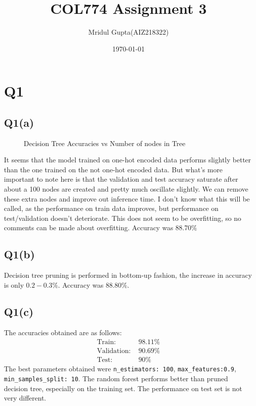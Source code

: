 \documentclass[11pt]{article}
\author{Mridul Gupta(AIZ218322)}
\date{\today}
\title{COL774 Assignment 3}
\begin{document}
\maketitle
\section{Q1}
\label{sec-1}
\subsection{Q1(a)}
\label{sec-1-1}
\begin{figure}[!ht]
	\caption{Decision Tree Accuracies vs Number of nodes in Tree}
\end{figure}
It seems that the model trained on one-hot encoded data performs
slightly better than the one trained on the not one-hot encoded
data. But what's more important to note here is that the validation
and test accuracy saturate after about a 100 nodes are created and
pretty much oscillate slightly. We can remove these extra nodes and
improve out inference time. I don't know what this will be called, as
the performance on train data improves, but performance on
test/validation doesn't deteriorate. This does not seem to be
overfitting, so no comments can be made about overfitting. Accuracy
was 88.70\(\%\)

\subsection{Q1(b)}
\label{sec-1-2}
Decision tree pruning is performed in bottom-up fashion, the increase
in accuracy is only \(0.2-0.3\%\). Accuracy was \(88.80\%\).
\subsection{Q1(c)}
\label{sec-1-3}
The accuracies obtained are as follows:
\begin{align*}
\text{Train: }&98.11\%\\
\text{Validation: }&90.69\%\\
\text{Test: }&90\%
\end{align*}
The best parameters obtained were \texttt{n\_estimators: 100},
\texttt{max\_features:0.9},\\ \texttt{min\_samples\_split: 10}. The random forest
performs better than pruned decision tree, especially on the training
set. The performance on test set is not very different.
\end{document}
